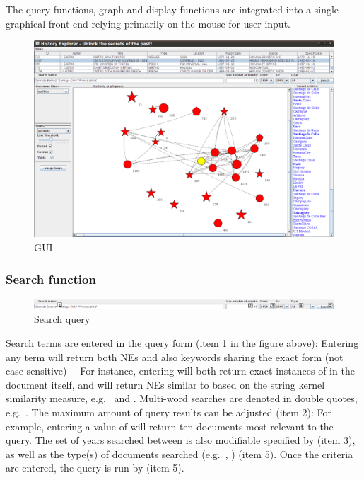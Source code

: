 The query functions, graph and display functions are integrated into a single graphical front-end relying primarily on the mouse for user input.

\begin{figure}[h]
\centering
\caption{GUI}
\includegraphics[width=160mm]{gui.png}
\end{figure}

\subsubsection{Search function}
\begin{figure}[h]
\centering
\caption{Search query}
\includegraphics[width=160mm]{search.png}
\end{figure}

Search terms are entered in the query form (item 1 in the figure above): Entering any term will return both NEs and also keywords sharing the exact form (not case-sensitive)--- For instance, entering  will both return exact instances of  in the document itself, and will return NEs similar to  based on the string kernel similarity measure, e.g.\  and . Multi-word searches are denoted in double quotes, e.g.\ . The maximum amount of query results can be adjusted (item 2): For example, entering a value of  will return ten documents most relevant to the query. The set of years searched between is also modifiable specified by (item 3), as well as the type(s) of documents searched (e.g.\ , ) (item 5). Once the criteria are entered, the query is run by (item 5).



